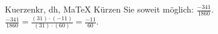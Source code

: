\begin{MAufgabe}{Kuerzen}{kr, dh, MaTeX}
K\"urzen Sie soweit m\"oglich: $\frac{-341}{1860}$.\\ 
\ifLsg\MLoesung
\quad $\frac{-341}{1860}=\frac{(31)\cdot(-11)}{(31)\cdot(60)}=\frac{-11}{60}$.\else\relax\fi
 \end{MAufgabe}